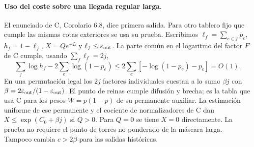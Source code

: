\paragraph{Uso del coste sobre una llegada regular larga.}
El enunciado de C, Corolario 6.8, dice primera salida. Para otro tablero fijo que cumple
las mismas cotas exteriores se usa su prueba. Escribimos $\ell_f=\sum_{e\in f}p_e$,
$h_f=1-\ell_f$, $X=Qe^{-L}$ y $\ell_f\le\varepsilon_{\rm out}$. La parte común en
el logaritmo del factor $F$ de C cumple, usando $\sum_f\ell_f=2j$,
\[
 \sum_f\log h_f-2\sum_e\log(1-p_e)
 \le 2\sum_e[-\log(1-p_e)-p_e]=O(1).
\]
En una permutación legal los $2j$ factores individuales cuestan a lo sumo
$\beta j$ con $\beta=2\varepsilon_{\rm out}/(1-\varepsilon_{\rm out})$.
El punto de reinas cumple difusión y brecha; es la tabla que usa C para los pesos
$W=p(1-p)$ de su permanente auxiliar. La estimación uniforme de ese permanente y
el cociente de normalizadores de C dan $X\le\exp(C_0+\beta j)$ si $Q>0$.
Para $Q=0$ se tiene $X=0$ directamente. La prueba no requiere el punto de torres
no ponderado de la máscara larga. Tampoco cambia $c>2\beta$ para las salidas históricas.
